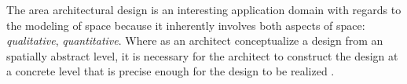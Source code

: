 \documentclass[12pt]{ucthesis}
\begin{document}
The area architectural design is an interesting application domain with regards to the modeling of space because it inherently involves both aspects of space: \emph{qualitative}, \emph{quantitative}. Where as an architect conceptualize a design from an spatially abstract level, it is necessary for the architect to construct the design at a concrete level that is precise enough for the design to be realized \cite{conceptual design stuff}. 





\end{document}
